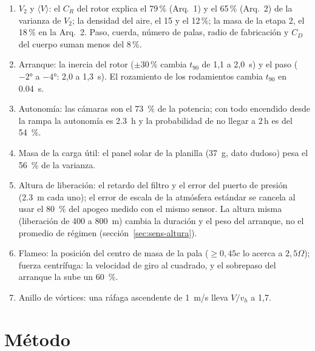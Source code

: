 \begin{resultado}
\begin{enumerate}[leftmargin=*]
  \item $V_2$ y $\langle V\rangle$: el $C_R$ del rotor explica el 79\,\% (Arq.~1) y el 65\,\% (Arq.~2) de
        la varianza de $V_2$; la densidad del aire, el 15 y el 12\,\%; la masa de la etapa 2, el 18\,\%
        en la Arq.~2. Paso, cuerda, número de palas, radio de fabricación y $C_D$ del cuerpo
        suman menos del 8\,\%.
  \item Arranque: la inercia del rotor ($\pm30$\,\% cambia $t_{90}$ de 1,1 a 2,0~s) y el paso
        ($\ang{-2}$ a $\ang{-4}$: 2,0 a 1,3~s). El rozamiento de los rodamientos cambia
        $t_{90}$ en \SI{0.04}{s}.
  \item Autonomía: las cámaras son el \SI{73}{\percent} de la potencia; con todo encendido
        desde la rampa la autonomía es \SI{2.3}{h} y la probabilidad de no llegar a 2\,h es
        del \SI{54}{\percent}.
  \item Masa de la carga útil: el panel solar de la planilla (\SI{37}{g}, dato dudoso) pesa
        el \SI{56}{\percent} de la varianza.
  \item Altura de liberación: el retardo del filtro y el error del puerto de presión
        (\SI{2.3}{m} cada uno); el error de escala de la atmósfera estándar se cancela al usar
        el \SI{80}{\percent} del apogeo medido con el mismo sensor. La altura misma (liberación
        de 400 a \SI{800}{m}) cambia la duración y el peso del arranque, no el promedio de régimen
        (sección~\ref{sec:sens-altura}).
  \item Flameo: la posición del centro de masa de la pala ($\ge0{,}45c$ lo acerca a
        $2{,}5\Omega$); fuerza centrífuga: la velocidad de giro al cuadrado, y el sobrepaso
        del arranque la sube un \SI{60}{\percent}.
  \item Anillo de vórtices: una ráfaga ascendente de \SI{1}{m/s} lleva $V/v_h$ a 1,7.
\end{enumerate}
\end{resultado}

\section{Método}\label{sec:sens-metodo}

